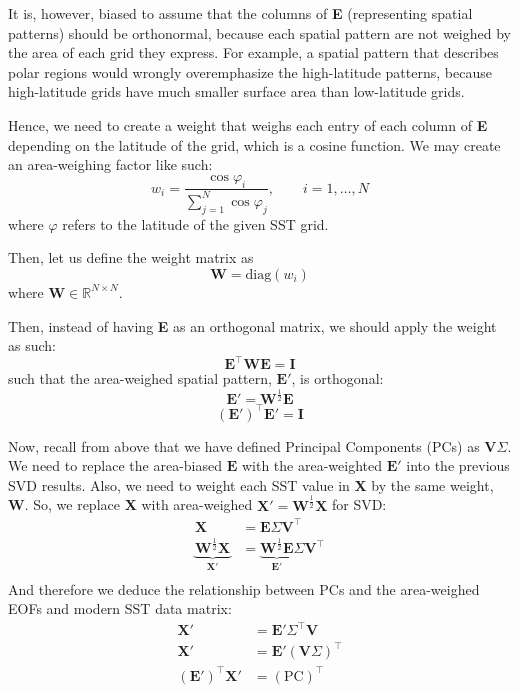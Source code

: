 \documentclass{article}
\begin{document}
It is, however, biased to assume that the columns of \textbf{E} (representing spatial patterns) should be orthonormal, because each spatial pattern are not weighed by the area of each grid they express.
For example, a spatial pattern that describes polar regions would wrongly overemphasize the high-latitude patterns, because high-latitude grids have much smaller surface area than low-latitude grids.

Hence, we need to create a weight that weighs each entry of each column of \textbf{E} depending on the latitude of the grid, which is a cosine function.
We may create an area-weighing factor like such: 
$$w_i = \frac{\cos\varphi_i}{\sum_{j=1}^{N} \cos\varphi_j}, \qquad i=1,\dots,N$$
where $\varphi$ refers to the latitude of the given SST grid.

Then, let us define the weight matrix as 
$$\textbf{W} = \text{diag}(w_i)$$
where $\textbf{W} \in \mathbb{R}^{N \times N}$.

Then, instead of having \textbf{E} as an orthogonal matrix, we should apply the weight as such:
$$\textbf{E}^\intercal \textbf{W} \textbf{E} = \textbf{I}$$
such that the area-weighed spatial pattern, $\textbf{E}'$, is orthogonal:
$$\textbf{E}' = \textbf{W}^{\frac{1}{2}} \textbf{E}$$
$$(\textbf{E}')^\intercal \textbf{E}' = \textbf{I}$$

Now, recall from above that we have defined Principal Components (PCs) as $\textbf{V}\Sigma$.
We need to replace the area-biased $\textbf{E}$ with the area-weighted $\textbf{E}'$ into the previous SVD results.
Also, we need to weight each SST value in \textbf{X} by the same weight, \textbf{W}.
So, we replace \textbf{X} with area-weighed $\textbf{X}' = \textbf{W}^{\frac{1}{2}} \textbf{X}$ for SVD:
\begin{align*}
    \textbf{X} &= \textbf{E} \Sigma \textbf{V}^\intercal \\
    \underbrace{\textbf{W}^{\frac{1}{2}} \textbf{X}}_{\textbf{X}'} &= \underbrace{\textbf{W}^{\frac{1}{2}} \textbf{E}}_{\textbf{E}'} \Sigma \textbf{V}^\intercal  \\
\end{align*}
And therefore we deduce the relationship between PCs and the area-weighed EOFs and modern SST data matrix:
\begin{align*}
    \textbf{X}' & = \textbf{E}' \Sigma^\intercal \textbf{V} \\
    \textbf{X}' & = \textbf{E}' (\textbf{V}\Sigma)^\intercal \\
    (\textbf{E}')^\intercal \textbf{X}' &= (\text{PC})^\intercal
\end{align*}
\end{document}
